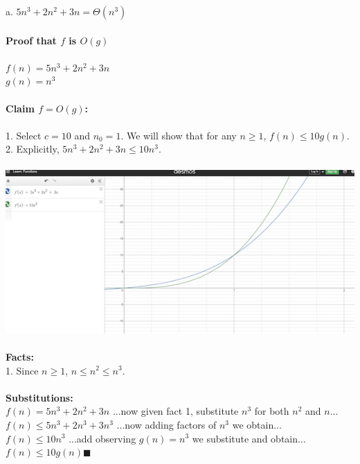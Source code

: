 \documentclass[OPONE]{example}
\begin{document}
\begin{list}{}{}
	\item {a.}  
	$5n^{3} + 2n^{2} + 3n = \Theta(n^{3})$  \\
	\\
	\textbf{Proof that $f$ is $O(g)$} \\ 
	\\
	$f(n) = 5n^{3} + 2n^{2} + 3n$ \\
	$g(n) = n^{3}$ \\
	\\
	\textbf{Claim $f = O(g)$: }\\
	\\
	1. Select $c = 10$ and $n_{0} = 1$.  We will show that for any $n \geq 1$, $f(n) \leq 10g(n)$. \\
	2. Explicitly, $5n^{3} + 2n^{2} + 3n \leq 10n^{3}$.\\
	\\
	\includegraphics{grapha} \\ 
	\\
	\textbf{Facts:} \\
	1. Since $n \geq 1$, $n \leq n^{2} \leq n^{3}$.\\
	\\
	\textbf{Substitutions:} \\
	$f(n) = 5n^{3} + 2n^{2} + 3n$ \hspace{1.06 in} ...now given fact 1, substitute $n^{3}$ for both $n^{2}$ and $n$... \\
	$f(n)  \leq 5n^{3} + 2n^{3} + 3n^{3}$  \hspace{1 in} ...now adding factors of $n^{3}$ we obtain... \\
	$f(n) \leq 10n^{3}$ \hspace{1.682 in} ...add observing $g(n) = n^{3}$ we substitute and obtain... \\
	$f(n) \leq 10g(n)  \blacksquare$ \\
	
	\newpage 
	

\end{list}
\end{document}
